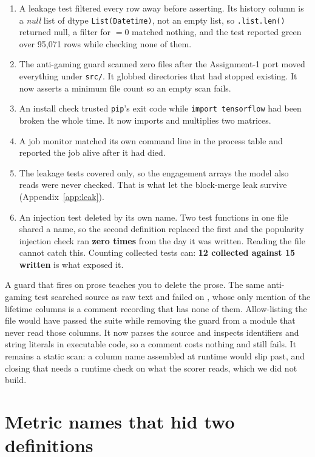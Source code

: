 \begin{enumerate}
\item A \mind{} leakage test filtered every row away before asserting. Its history column is a
  \emph{null} list of dtype \texttt{List(Datetime)}, not an empty list, so \texttt{.list.len()}
  returned null, a filter for $=0$ matched nothing, and the test reported green over 95,071 rows
  while checking none of them.
\item The anti-gaming guard scanned zero files after the Assignment-1 port moved everything under
  \texttt{src/}. It globbed directories that had stopped existing. It now asserts a minimum file
  count so an empty scan fails.
\item An install check trusted \texttt{pip}'s exit code while \texttt{import tensorflow} had been
  broken the whole time. It now imports and multiplies two matrices.
\item A job monitor matched its own command line in the process table and reported the job alive
  after it had died.
\item The leakage tests covered  only, so the engagement arrays the model also
  reads were never checked. That is what let the block-merge leak survive (Appendix~\ref{app:leak}).
\item An injection test deleted by its own name. Two test functions in one file shared a
  name, so the second definition replaced the first and the popularity injection check ran
  \textbf{zero times} from the day it was written. Reading the file cannot catch this. Counting
  collected tests can: \textbf{12 collected against 15 written} is what exposed it.
\end{enumerate}

A guard that fires on prose teaches you to delete the prose. The same anti-gaming test
searched source as raw text and failed on , whose only mention of the
lifetime columns is a comment recording that \mind{} has none of them. Allow-listing the file would
have passed the suite while removing the guard from a module that never read those columns. It now
parses the source and inspects identifiers and string literals in executable code, so a comment
costs nothing and  still fails. It remains a static scan: a column
name assembled at runtime would slip past, and closing that needs a runtime check on what the
scorer reads, which we did not build.

\section{Metric names that hid two definitions}
\label{app:names}

